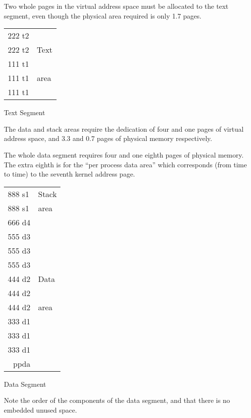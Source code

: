 Two whole pages in the virtual address
space must be allocated to the text
segment, even though the physical area
required is only 1.7 pages.
 
\begin{center}
\begin{tabular}{|l|l} \cline{1-1}
\cline{1-1}
222  t2 & \\
222  t2 & Text \\
\cline{1-1}
111  t1 & \\
111  t1 & area \\
111  t1 & \\
\cline{1-1}
\end{tabular}

\medskip

Text Segment
\end{center}

The data and stack areas require the
dedication of four and one pages of
virtual address space, and 3.3 and 0.7
pages of physical memory respectively.

The whole data segment requires four
and one eighth pages of physical
memory. The extra eighth is for the
``per process data area'' which
corresponds (from time to time) to the
seventh kernel address page.


\begin{center}
\begin{tabular}{|l|l} \cline{1-1}
888  s1 & Stack \\
888  s1 & area \\
\cline{1-1}
666  d4 & \\
\cline{1-1}
555  d3 & \\
555  d3 & \\
555  d3 & \\
\cline{1-1}
444  d2 & Data \\
444  d2 & \\
444  d2 & area \\
\cline{1-1}
333  d1 & \\
333  d1 & \\
333  d1 & \\
\cline{1-1}
\multicolumn{1}{|r|}{ppda} & \\
\cline{1-1}
\end{tabular}

\medskip

Data Segment
\end{center}

\noindent Note the order of the components of the
data segment, and that there is no
embedded unused space.

